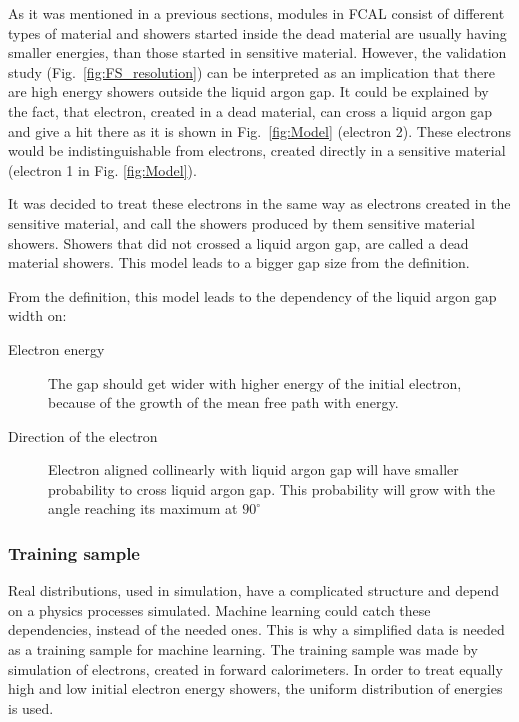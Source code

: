 As it was mentioned in a previous sections, modules in FCAL consist of different types of material and showers started inside the dead material are usually having smaller energies, than those started in sensitive material. However, the validation study (Fig.~\ref{fig:FS_resolution}) can be interpreted as an implication that there are high energy showers outside the liquid argon gap. It could be explained by the fact, that electron, created in a dead material, can cross a liquid argon gap and give a hit there as it is shown in Fig.~\ref{fig:Model} (electron 2). These electrons would be indistinguishable from electrons, created directly in a sensitive material (electron 1 in Fig. \ref{fig:Model}). 

It was decided to treat these electrons in the same way as electrons created in the sensitive material, and call the showers produced by them sensitive material showers. Showers that did not crossed a liquid argon gap, are called a dead material showers. This model leads to a bigger gap size from the definition.

From the definition, this model leads to the dependency of the liquid argon gap width on:
\begin{description}

\item [Electron energy] The gap should get wider with higher energy of the initial electron, because of the growth of the mean free path with energy.
\item [Direction of the electron] Electron aligned collinearly with liquid argon gap will have smaller probability to cross liquid argon gap. This probability will grow with the angle reaching its maximum at  $90^{\circ}$

\end{description}

\subsubsection{Training sample}

Real distributions, used in simulation, have a complicated structure and depend on a physics processes simulated. Machine learning could catch these dependencies, instead of the needed ones. This is why a simplified data is needed as a training sample for machine learning. The training sample was made by simulation of electrons, created in forward calorimeters. In order to treat equally high and low initial electron energy showers, the uniform distribution of energies is used.

